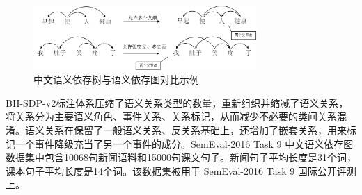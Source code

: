 \begin{figure}[tbhp]
	\centering
	\includegraphics[width=85mm]{picture/sem16diff.jpg}
	\caption{中文语义依存树与语义依存图对比示例}
	\label{fig:sem16diff}
\end{figure}

BH-SDP-v2标注体系压缩了语义关系类型的数量，重新组织并缩减了语义关系，将关系分为主要语义角色、事件关系、关系标记，从而减少不必要的类间关系混淆。语义关系在保留了一般语义关系、反关系基础上，还增加了嵌套关系，用来标记一个事件降级充当了另一个事件的成分。SemEval-2016 Task 9 中文语义依存图数据集中包含10068句新闻语料和15000句课文句子。新闻句子平均长度是31个词，课本句子平均长度是14个词。该数据集被用于 SemEval-2016 Task 9 国际公开评测上。

